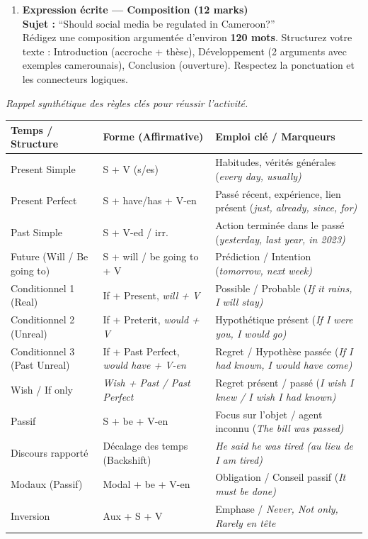 \documentclass[11pt]{article}
\newcounter{popsec}
\newcounter{popsub}
\newcommand{\courssub}[1]{%
  \stepcounter{popsub}%
  \par\vspace{9pt}\noindent{\popxbold\fontsize{11.5}{13}\selectfont\color{popink}{\color{poporange}\thepopsec.\thepopsub}\hspace{6pt}#1}\par\nopagebreak\vspace{4pt}
}
\newcommand{\eng}[1]{\ifmmode\text{\textit{#1}}\else\begingroup\selectlanguage{english}\itshape #1\endgroup\fi}
\begin{document}
\begin{enumerate}
    \item \textbf{Expression écrite — Composition (12 marks)} \\
    \textbf{Sujet :} “Should social media be regulated in Cameroon?” \\
    Rédigez une composition argumentée d'environ \textbf{120 mots}. Structurez votre texte : Introduction (accroche + thèse), Développement (2 arguments avec exemples camerounais), Conclusion (ouverture). Respectez la ponctuation et les connecteurs logiques.
\end{enumerate}

\courssub{Ressources à mobiliser}
\emph{Rappel synthétique des règles clés pour réussir l'activité.}

\begin{propriete}
\begin{center}
\begin{tabularx}{\linewidth}{|X|X|X|}
\hline
\rowcolor{popblueL} \textbf{Temps / Structure} & \textbf{Forme (Affirmative)} & \textbf{Emploi clé / Marqueurs} \\ \hline
Present Simple & S + V (s/es) & Habitudes, vérités générales (\eng{every day, usually}) \\ \hline
Present Perfect & S + have/has + V-en & Passé récent, expérience, lien présent (\eng{just, already, since, for}) \\ \hline
Past Simple & S + V-ed / irr. & Action terminée dans le passé (\eng{yesterday, last year, in 2023}) \\ \hline
Future (Will / Be going to) & S + will / be going to + V & Prédiction / Intention (\eng{tomorrow, next week}) \\ \hline
Conditionnel 1 (Real) & If + Present, \eng{will} + V & Possible / Probable (\eng{If it rains, I will stay}) \\ \hline
Conditionnel 2 (Unreal) & If + Preterit, \eng{would} + V & Hypothétique présent (\eng{If I were you, I would go}) \\ \hline
Conditionnel 3 (Past Unreal) & If + Past Perfect, \eng{would have} + V-en & Regret / Hypothèse passée (\eng{If I had known, I would have come}) \\ \hline
Wish / If only & \eng{Wish} + Past / Past Perfect & Regret présent / passé (\eng{I wish I knew / I wish I had known}) \\ \hline
Passif & S + be + V-en & Focus sur l'objet / agent inconnu (\eng{The bill was passed}) \\ \hline
Discours rapporté & Décalage des temps (Backshift) & \eng{He said he was tired} (au lieu de \eng{I am tired}) \\ \hline
Modaux (Passif) & Modal + be + V-en & Obligation / Conseil passif (\eng{It must be done}) \\ \hline
Inversion & Aux + S + V & Emphase / \eng{Never, Not only, Rarely} en tête \\ \hline
\end{tabularx}
\end{center}
\end{propriete}
\end{document}
